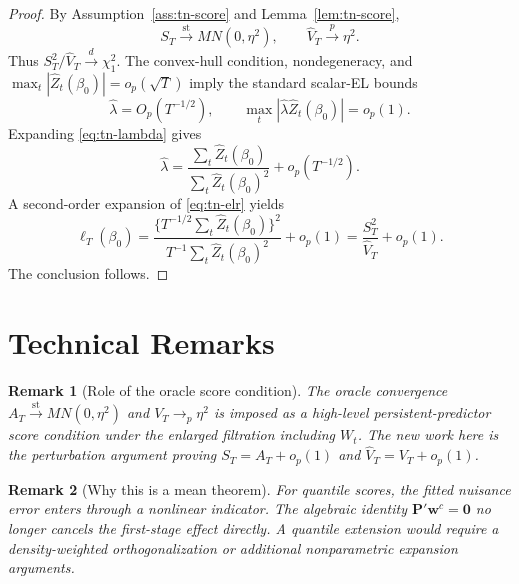\documentclass[11pt]{article}
\newtheorem{remark}{Remark}
\begin{document}
\begin{proof}
By Assumption~\ref{ass:tn-score} and Lemma~\ref{lem:tn-score},
\[
    S_T\xrightarrow{\mathrm{st}}MN(0,\eta^2),
    \qquad
    \widehat V_T\xrightarrow{p}\eta^2.
\]
Thus \(S_T^2/\widehat V_T\xrightarrow{d}\chi_1^2\). The convex-hull condition, nondegeneracy, and \(\max_t|\widehat Z_t(\beta_0)|=o_p(\sqrt T)\) imply the standard scalar-EL bounds
\[
    \widehat\lambda=O_p(T^{-1/2}),
    \qquad
    \max_t|\widehat\lambda\widehat Z_t(\beta_0)|=o_p(1).
\]
Expanding \eqref{eq:tn-lambda} gives
\[
    \widehat\lambda
      =\frac{\sum_t\widehat Z_t(\beta_0)}{\sum_t\widehat Z_t(\beta_0)^2}+o_p(T^{-1/2}).
\]
A second-order expansion of \eqref{eq:tn-elr} yields
\[
    \ell_T(\beta_0)
      =\frac{\{T^{-1/2}\sum_t\widehat Z_t(\beta_0)\}^2}
             {T^{-1}\sum_t\widehat Z_t(\beta_0)^2}+o_p(1)
      =\frac{S_T^2}{\widehat V_T}+o_p(1).
\]
The conclusion follows.
\end{proof}

\section{Technical Remarks}

\begin{remark}[Role of the oracle score condition]
The oracle convergence \(A_T\xrightarrow{\mathrm{st}}MN(0,\eta^2)\) and \(V_T\to_p\eta^2\) is imposed as a high-level persistent-predictor score condition under the enlarged filtration including \(W_t\). The new work here is the perturbation argument proving \(S_T=A_T+o_p(1)\) and \(\widehat V_T=V_T+o_p(1)\).
\end{remark}

\begin{remark}[Why this is a mean theorem]
For quantile scores, the fitted nuisance error enters through a nonlinear indicator. The algebraic identity \(\bm P'\bm w^c=\bm0\) no longer cancels the first-stage effect directly. A quantile extension would require a density-weighted orthogonalization or additional nonparametric expansion arguments.
\end{remark}
\end{document}
